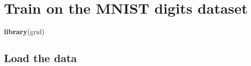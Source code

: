 \documentclass[]{book}
\newenvironment{Shaded}{\begin{snugshade}}{\end{snugshade}}
\newcommand{\KeywordTok}[1]{\textcolor[rgb]{0.13,0.29,0.53}{\textbf{#1}}}
\newcommand{\NormalTok}[1]{#1}
\begin{document}
\hypertarget{train-on-the-mnist-digits-dataset}{%
\section{Train on the MNIST digits dataset}\label{train-on-the-mnist-digits-dataset}}

\begin{Shaded}
\begin{Highlighting}[]
\KeywordTok{library}\NormalTok{(grid)}
\end{Highlighting}
\end{Shaded}

\hypertarget{load-the-data}{%
\subsection{Load the data}\label{load-the-data}}
\end{document}
